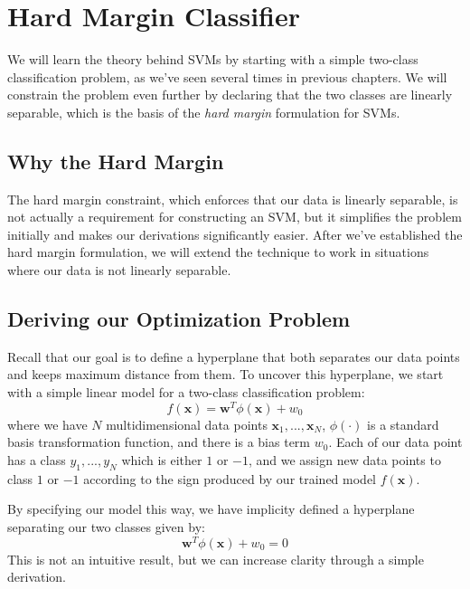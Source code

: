 \section{Hard Margin Classifier}
We will learn the theory behind SVMs by starting with a simple two-class classification problem, as we've seen several times in previous chapters. We will constrain the problem even further by declaring that the two classes are linearly separable, which is the basis of the \textit{hard margin} formulation for SVMs.


\subsection{Why the Hard Margin}
The hard margin constraint, which enforces that our data is linearly separable, is not actually a requirement for constructing an SVM, but it simplifies the problem initially and makes our derivations significantly easier. After we've established the hard margin formulation, we will extend the technique to work in situations where our data is not linearly separable.

\subsection{Deriving our Optimization Problem}
Recall that our goal is to define a hyperplane that both separates our data points and keeps maximum distance from them. To uncover this hyperplane, we start with a simple linear model for a two-class classification problem:
\begin{equation} \label{classification-fn}
f(\textbf{x}) = \textbf{w}^{T}\phi(\textbf{x}) + w_{0}
\end{equation}
where we have $N$ multidimensional data points $\textbf{x}_{1}, ..., \textbf{x}_{N}$, $\phi(\cdot)$ is a standard basis transformation function, and there is a bias term $w_{0}$. Each of our data point has a class $y_{1}, ..., y_{N}$ which is either $1$ or $-1$, and we assign new data points to class $1$ or $-1$ according to the sign produced by our trained model $f(\textbf{x})$.

By specifying our model this way, we have implicity defined a hyperplane separating our two classes given by:
\begin{equation} \label{implicit-hyperplane}
	\textbf{w}^{T}\phi(\textbf{x}) + w_{0} = 0
\end{equation}
This is not an intuitive result, but we can increase clarity through a simple derivation.

